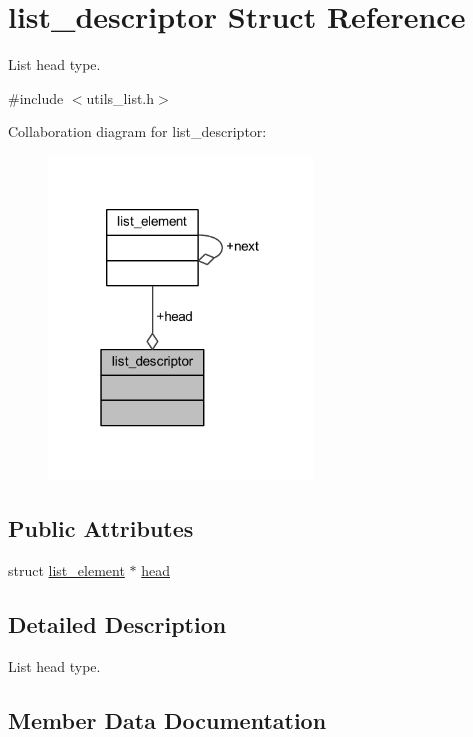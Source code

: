 \hypertarget{structlist__descriptor}{}\section{list\+\_\+descriptor Struct Reference}
\label{structlist__descriptor}


List head type.  




{\ttfamily \#include $<$utils\+\_\+list.\+h$>$}



Collaboration diagram for list\+\_\+descriptor\+:
\nopagebreak
\begin{figure}[H]
\begin{center}
\leavevmode
\includegraphics[width=199pt]{structlist__descriptor__coll__graph}
\end{center}
\end{figure}
\subsection*{Public Attributes}
\begin{DoxyCompactItemize}
\item 
struct \hyperlink{structlist__element}{list\+\_\+element} $\ast$ \hyperlink{structlist__descriptor_acc7a3bb5c92dc985a2a7c27c958f1ed8}{head}
\end{DoxyCompactItemize}


\subsection{Detailed Description}
List head type. 

\subsection{Member Data Documentation}
\mbox{\label{structlist__descriptor_acc7a3bb5c92dc985a2a7c27c958f1ed8}} 
